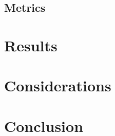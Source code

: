 \documentclass[sigconf]{acmart}
\begin{document}
\subsection{Metrics}
\label{metrics}
\label{methods}
\section{Results}
\label{results}
\section{Considerations}
\label{considerations}
\section{Conclusion}
\label{conclusion}
\end{document}
